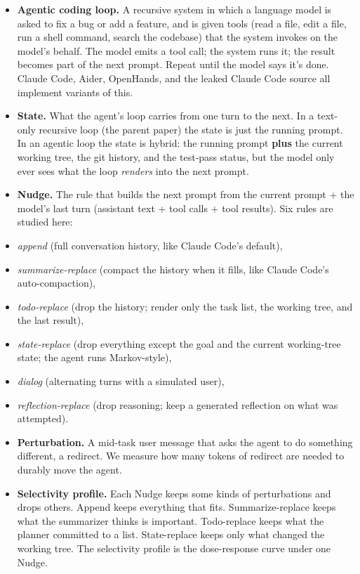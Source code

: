 \documentclass{article}
\theoremstyle{plain}
\theoremstyle{definition}
\begin{document}
\begin{itemize}
  \item \textbf{Agentic coding loop.} A recursive system in which a language model is asked to fix a bug or add a feature, and is given tools (read a file, edit a file, run a shell command, search the codebase) that the system invokes on the model's behalf. The model emits a tool call; the system runs it; the result becomes part of the next prompt. Repeat until the model says it's done. Claude Code, Aider, OpenHands, and the leaked Claude Code source all implement variants of this.
  \item \textbf{State.} What the agent's loop carries from one turn to the next. In a text-only recursive loop (the parent paper) the state is just the running prompt. In an agentic loop the state is hybrid: the running prompt \textbf{plus} the current working tree, the git history, and the test-pass status, but the model only ever sees what the loop \textit{renders} into the next prompt.
  \item \textbf{Nudge.} The rule that builds the next prompt from the current prompt + the model's last turn (assistant text + tool calls + tool results). Six rules are studied here:
  \item \textit{append} (full conversation history, like Claude Code's default),
  \item \textit{summarize-replace} (compact the history when it fills, like Claude Code's auto-compaction),
  \item \textit{todo-replace} (drop the history; render only the task list, the working tree, and the last result),
  \item \textit{state-replace} (drop everything except the goal and the current working-tree state; the agent runs Markov-style),
  \item \textit{dialog} (alternating turns with a simulated user),
  \item \textit{reflection-replace} (drop reasoning; keep a generated reflection on what was attempted).
  \item \textbf{Perturbation.} A mid-task user message that asks the agent to do something different, a redirect. We measure how many tokens of redirect are needed to durably move the agent.
  \item \textbf{Selectivity profile.} Each Nudge keeps some kinds of perturbations and drops others. Append keeps everything that fits. Summarize-replace keeps what the summarizer thinks is important. Todo-replace keeps what the planner committed to a list. State-replace keeps only what changed the working tree. The selectivity profile is the dose-response curve under one Nudge.
\end{itemize}
\end{document}
